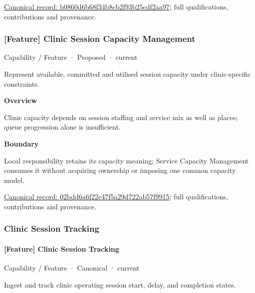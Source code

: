 {\footnotesize \href{../../../../continuum/strategy/capability/feature/b0860d6b68f34b8cb2f93b25cdf2aa97.md}{Canonical record: b0860d6b68f34b8cb2f93b25cdf2aa97}; full qualifications, contributions and provenance.}\par
\subsubsection{[Feature] Clinic Session Capacity Management}

\label{element:02bdd6a6f22e47f5a29d722ab57f9915}
{\small Capability / Feature · Proposed · current}\par

Represent available, committed and utilised session capacity under clinic-specific constraints.



\textbf{Overview}



Clinic capacity depends on session staffing and service mix as well as places; queue progression alone is insufficient.



\textbf{Boundary}



Local responsibility retains its capacity meaning; Service Capacity Management consumes it without acquiring ownership or imposing one common capacity model.


{\footnotesize \href{../../../../continuum/strategy/capability/feature/02bdd6a6f22e47f5a29d722ab57f9915.md}{Canonical record: 02bdd6a6f22e47f5a29d722ab57f9915}; full qualifications, contributions and provenance.}\par
\subsubsection{Clinic Session Tracking}

\paragraph{[Feature] Clinic Session Tracking}

\label{element:03e185a6e0d145c3975b3f4715c94207}
{\small Capability / Feature · Canonical · current}\par

Ingest and track clinic operating session start, delay, and completion states.



